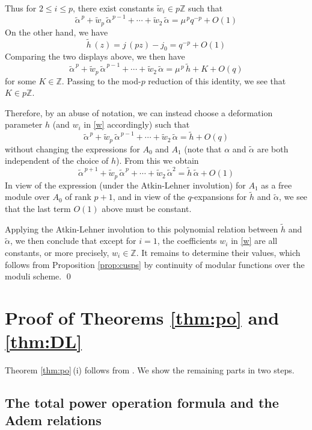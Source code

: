 \documentclass{gtpart}
\theoremstyle{definition}
\theoremstyle{remark}
\newcommand{\mb}[1]{\mathbb{#1}}
\newcommand{\BZ}{{\mb Z}}
\newcommand{\tA}{\widetilde{\A}}
\renewcommand{\th}{\widetilde{h}}
\newcommand{\tw}{\widetilde{w}}
\newcommand{\A}{\alpha}
\renewcommand{\=}{\approx}
\renewcommand{\-}{\sim}
\numberwithin{equation}{section}
\begin{document}
Thus for $2 \leq i \leq p$, there exist constants $\tw_i \in p\BZ$ such that 
\[
 \tA^{\,p} + \tw_p \, \tA^{\,p - 1} + \cdots + \tw_2 \, \tA = \mu^{\,p} q^{-p} 
 + O(1) 
\]
On the other hand, we have 
\[
 \th\,(z) = j\,(p z) - j_0 = q^{-p} + O(1) 
\]
Comparing the two displays above, we then have 
\[
 \tA^{\,p} + \tw_p \, \tA^{\,p - 1} + \cdots + \tw_2 \, \tA = \mu^{\,p} \, \th 
 + K + O(q) 
\]
for some $K \in \BZ$.  Passing to the mod-$p$ reduction of this identity, we see 
that $K \in p\BZ$.  

Therefore, by an abuse of notation, we can instead choose a deformation 
parameter $h$ (and $w_i$ in \eqref{w} accordingly) such that 
\[
 \tA^{\,p} + \tw_p \, \tA^{\,p - 1} + \cdots + \tw_2 \, \tA = \th + O(q) 
\]
without changing the expressions for $A_0$ and $A_1$ (note that $\A$ and $\tA$ 
are both independent of the choice of $h$).  From this we obtain 
\[
 \tA^{\,p + 1} + \tw_p \, \tA^{\,p} + \cdots + \tw_2 \, \tA^2 = \th \, \tA 
 + O(1) 
\]
In view of the expression (under the Atkin-Lehner involution) for $A_1$ as a 
free module over $A_0$ of rank $p + 1$, and in view of the $q$-expansions for 
$\th$ and $\tA$, we see that the last term $O(1)$ above must be constant.  

Applying the Atkin-Lehner involution to this polynomial relation between $\th$ 
and $\tA$, we then conclude that except for $i = 1$, the coefficients $w_i$ in 
\eqref{w} are all constants, or more precisely, $w_i \in \BZ$.  It remains to 
determine their values, which follows from Proposition \ref{prop:cusps} by 
continuity of modular functions over the moduli scheme.  \qed



\section{Proof of Theorems \ref{thm:po} and \ref{thm:DL}}

Theorem \ref{thm:po}\,(i) follows from \cite[Theorem 1.1]{Str98}.  We show the 
remaining parts in two steps.  

\subsection{The total power operation formula and the Adem relations}
\end{document}
